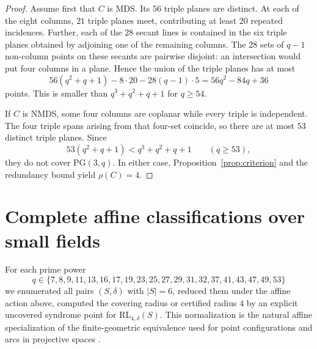 \documentclass[11pt]{article}
\newcommand{\PG}{\mathrm{PG}}
\newcommand{\RL}{\mathrm{RL}}
\theoremstyle{plain}
\theoremstyle{definition}
\begin{document}
\begin{proof}
Assume first that \(C\) is MDS.  Its \(56\) triple planes are distinct.  At
each of the eight columns, \(21\) triple planes meet, contributing at least
\(20\) repeated incidences.  Further, each of the \(28\) secant lines is
contained in the six triple planes obtained by adjoining one of the remaining
columns.  The \(28\) sets of \(q-1\) non-column points on these secants are
pairwise disjoint: an intersection would put four columns in a plane.  Hence
the union of the triple planes has at most
\[
  56(q^2+q+1)-8\cdot20-28(q-1)\cdot5
  =56q^2-84q+36
\]
points.  This is smaller than \(q^3+q^2+q+1\) for \(q\ge54\).

If \(C\) is NMDS, some four columns are coplanar while every triple is
independent.  The four triple spans arising from that four-set coincide, so
there are at most \(53\) distinct triple planes.  Since
\[
  53(q^2+q+1)<q^3+q^2+q+1\qquad(q\ge53),
\]
they do not cover \(\PG(3,q)\).  In either case,
Proposition~\ref{prop:criterion} and the redundancy bound yield
\(\rho(C)=4\).
\end{proof}

\section{Complete affine classifications over small fields}

For each prime power
\[
q\in\{7,8,9,11,13,16,17,19,23,25,27,29,31,32,37,41,43,47,49,53\}
\]
we enumerated all pairs \((S,\delta)\) with
\(|S|=6\), reduced them under the affine action above, computed the covering
radius or certified radius \(4\) by an explicit uncovered syndrome point for
\(\RL_{4,\delta}(S)\).  This normalization is the natural affine
specialization of the finite-geometric equivalence used for point
configurations and arcs in projective spaces \cite{Ball2015}.
\end{document}
